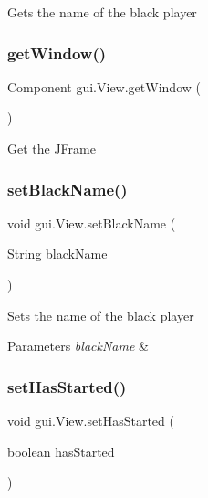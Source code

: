 Gets the name of the black player \mbox{\label{classgui_1_1_view_aeb332c6eee8b72e856b4eae786e4c736}} 
\subsubsection{\texorpdfstring{get\+Window()}{getWindow()}}
{\footnotesize\ttfamily Component gui.\+View.\+get\+Window (\begin{DoxyParamCaption}{ }\end{DoxyParamCaption})}

Get the J\+Frame \mbox{\label{classgui_1_1_view_afe1af467431c5b0f21bf71ef0b869b21}} 
\subsubsection{\texorpdfstring{set\+Black\+Name()}{setBlackName()}}
{\footnotesize\ttfamily void gui.\+View.\+set\+Black\+Name (\begin{DoxyParamCaption}\item[{String}]{black\+Name }\end{DoxyParamCaption})}

Sets the name of the black player 
\begin{DoxyParams}{Parameters}
{\em black\+Name} & \\
\hline
\end{DoxyParams}
\mbox{\label{classgui_1_1_view_aef80a66972e0010e3ec6b0cd9899bc05}} 
\subsubsection{\texorpdfstring{set\+Has\+Started()}{setHasStarted()}}
{\footnotesize\ttfamily void gui.\+View.\+set\+Has\+Started (\begin{DoxyParamCaption}\item[{boolean}]{has\+Started }\end{DoxyParamCaption})}

